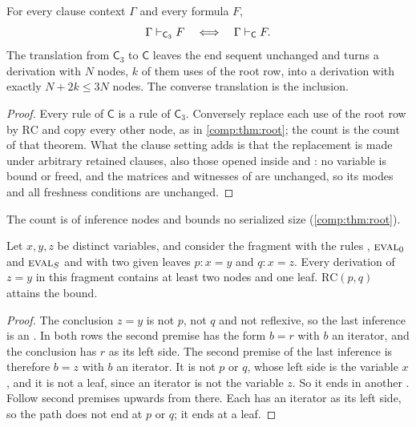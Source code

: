 \begin{theorem}
\label{claus:thm:twocase}
For every clause context $\Gamma$ and every formula $F$,
\[
 \Gamma\vdash_{\mathsf{C}_3}F\quad\Longleftrightarrow\quad
 \Gamma\vdash_{\mathsf{C}}F .
\]
The translation from $\mathsf{C}_3$ to $\mathsf{C}$ leaves the end sequent
unchanged and turns a derivation with $N$ nodes, $k$ of them uses of the
root row, into a derivation with exactly $N+2k\le 3N$ nodes. The converse
translation is the inclusion.
\end{theorem}
\begin{proof}
Every rule of $\mathsf{C}$ is a rule of $\mathsf{C}_3$. Conversely replace
each use of the root row by $\mathrm{RC}$ and copy every other node, as in
\cref{comp:thm:root}; the count is the count of that theorem. What the
clause setting adds is that the replacement is made under arbitrary
retained clauses, also those opened inside  and
: no variable is bound or freed, and the matrices and
witnesses of  are unchanged, so its modes and all
freshness conditions are unchanged.
\end{proof}

The count is of inference nodes and bounds no serialized size
(\cref{comp:thm:root}).

\begin{proposition}
\label{claus:prop:threenodes}
Let $x,y,z$ be distinct variables, and consider the fragment with the rules
, $\rulename{Eval}_0$ and $\rulename{Eval}_{\Suc}$ and with
two given leaves $p:x=y$ and $q:x=z$. Every derivation of $z=y$ in this
fragment contains at least two  nodes and one
 leaf. $\mathrm{RC}(p,q)$ attains the bound.
\end{proposition}
\begin{proof}
The conclusion $z=y$ is not $p$, not $q$ and not reflexive, so the last
inference is an . In both rows the second premise has the
form $b=r$ with $b$ an iterator, and the conclusion has $r$ as its left
side. The second premise of the last inference is therefore $b=z$ with $b$
an iterator. It is not $p$ or $q$, whose left side is the variable $x$, and
it is not a  leaf, since an iterator is not the variable
$z$. So it ends in another . Follow second premises upwards
from there. Each has an iterator as its left side, so the path does not end
at $p$ or $q$; it ends at a  leaf.
\end{proof}

